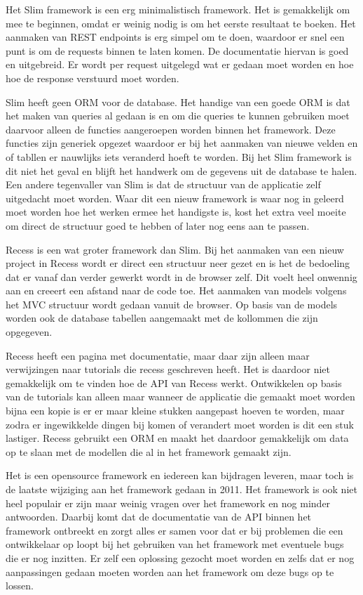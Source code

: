 \documentclass[a4paper,11pt,oneside]{report}
\begin{document}
Het Slim framework is een erg minimalistisch framework. Het is gemakkelijk om
mee te beginnen, omdat er weinig nodig is om het eerste resultaat te boeken. Het
aanmaken van REST endpoints is erg simpel om te doen, waardoor er snel een punt
is om de requests binnen te laten komen. De documentatie hiervan is goed en
uitgebreid. Er wordt per request uitgelegd wat er gedaan moet worden en hoe hoe
de response verstuurd moet worden.

Slim heeft geen ORM voor de database. Het handige van een goede ORM is dat het
maken van queries al gedaan is en om die queries te kunnen gebruiken moet
daarvoor alleen de functies aangeroepen worden binnen het framework. Deze
functies zijn generiek opgezet waardoor er bij het aanmaken van nieuwe velden en
of tabllen er nauwlijks iets veranderd hoeft te worden. Bij het Slim framework
is dit niet het geval en blijft het handwerk om de gegevens uit de database te
halen. Een andere tegenvaller van Slim is dat de structuur van de applicatie
zelf uitgedacht moet worden. Waar dit een nieuw framework is waar nog in geleerd
moet worden hoe het werken ermee het handigste is, kost het extra veel moeite om
direct de structuur goed te hebben of later nog eens aan te passen.
\newline

Recess is een wat groter framework dan Slim. Bij het aanmaken van een nieuw
project in Recess wordt er direct een structuur neer gezet en is het de
bedoeling dat er vanaf dan verder gewerkt wordt in de browser zelf. Dit voelt
heel onwennig aan en creeert een afstand naar de code toe. Het aanmaken van
models volgens het MVC structuur wordt gedaan vanuit de browser. Op basis van de
models worden ook de database tabellen aangemaakt met de kollommen die zijn
opgegeven.

Recess heeft een pagina met documentatie, maar daar zijn alleen maar
verwijzingen naar tutorials die recess geschreven heeft. Het is daardoor niet
gemakkelijk om te vinden hoe de API van Recess werkt. Ontwikkelen op basis van
de tutorials kan alleen maar wanneer de applicatie die gemaakt moet worden bijna
een kopie is er er maar kleine stukken aangepast hoeven te worden, maar zodra er
ingewikkelde dingen bij komen of verandert moet worden is dit een stuk lastiger.
Recess gebruikt een ORM en maakt het daardoor gemakkelijk om data op te slaan
met de modellen die al in het framework gemaakt zijn.

Het is een opensource framework en iedereen kan bijdragen leveren, maar toch is
de laatste wijziging aan het framework gedaan in 2011. Het framework is ook niet
heel populair er zijn maar weinig vragen over het framework en nog minder
antwoorden. Daarbij komt dat de documentatie van de API binnen het framework
ontbreekt en zorgt alles er samen voor dat er bij problemen die een ontwikkelaar
op loopt bij het gebruiken van het framework met eventuele bugs die er nog
inzitten. Er zelf een oplossing gezocht moet worden en zelfs dat er nog
aanpassingen gedaan moeten worden aan het framework om deze bugs op te lossen.
\newline
\end{document}
